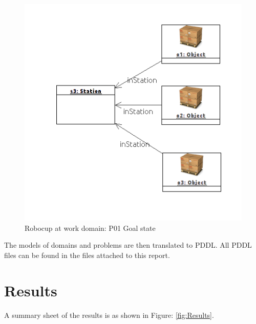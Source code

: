 \documentclass{article}
\begin{document}
\begin{figure}[H] %
	\centering
	\includegraphics[width=8 cm]{figures/p01_goal.png} 
	\caption{Robocup at work domain: P01 Goal state}
	\label{fig:goal}
\end{figure}

The models of domains and problems are then translated to PDDL. All PDDL files can be found in the files attached to this report.

\newpage
\section{Results}
A summary sheet of the results is as shown in Figure: \ref{fig:Results}. 
\end{document}
